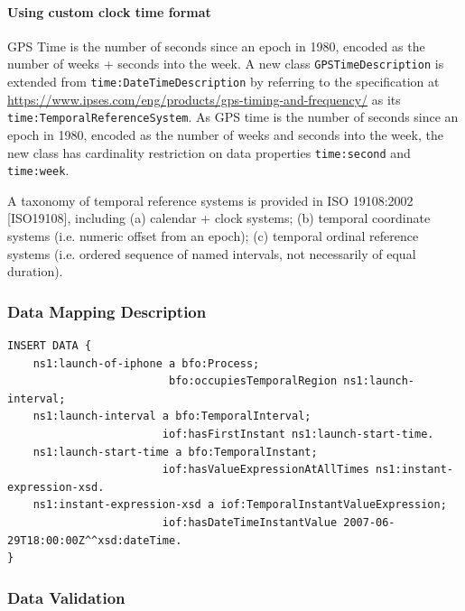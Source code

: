 \paragraph{Using custom clock time format \\}

GPS Time is the number of seconds since an epoch in 1980, encoded as the number of weeks + seconds into the week. A new class \texttt{GPSTimeDescription} is extended from \texttt{time:DateTimeDescription} by referring to the specification at \url{https://www.ipses.com/eng/products/gps-timing-and-frequency/} as its \texttt{time:TemporalReferenceSystem}. As GPS time is the number of seconds since an epoch in 1980, encoded as the number of weeks and seconds into the week, the new class has cardinality restriction on data properties \texttt{time:second} and \texttt{time:week}.

A taxonomy of temporal reference systems is provided in ISO 19108:2002 [ISO19108], including (a) calendar + clock systems; (b) temporal coordinate systems (i.e. numeric offset from an epoch); (c) temporal ordinal reference systems (i.e. ordered sequence of named intervals, not necessarily of equal duration).


\subsubsection*{Data Mapping Description}

\begin{verbatim}
INSERT DATA {
    ns1:launch-of-iphone a bfo:Process;
                         bfo:occupiesTemporalRegion ns1:launch-interval;
    ns1:launch-interval a bfo:TemporalInterval;
                        iof:hasFirstInstant ns1:launch-start-time.
    ns1:launch-start-time a bfo:TemporalInstant;
                        iof:hasValueExpressionAtAllTimes ns1:instant-expression-xsd.
    ns1:instant-expression-xsd a iof:TemporalInstantValueExpression; 
                        iof:hasDateTimeInstantValue 2007-06-29T18:00:00Z^^xsd:dateTime.
}
\end{verbatim}


\subsubsection*{Data Validation}

